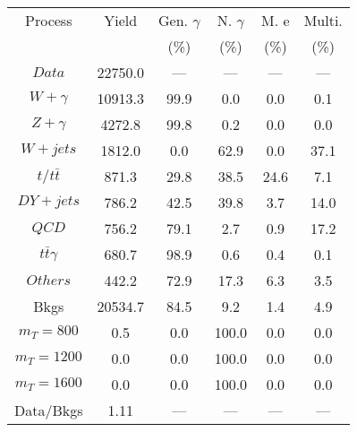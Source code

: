 \begin{figure}
\begin{minipage}[c]{0.32\textwidth}
{\begin{tabular}{cccccc}
\hline
Process & Yield & Gen. $\gamma$ & N. $\gamma$ & M. e & Multi. \\
 &  & (\%) & (\%) & (\%) & (\%)  \\
\hline
                                                                      $ Data $ &  22750.0 &  --- &  --- &  --- &  ---\\
$ W+\gamma $ &  10913.3 &  99.9 &  0.0 &  0.0 &  0.1\\
$ Z+\gamma $ &  4272.8 &  99.8 &  0.2 &  0.0 &  0.0\\
$ W+jets $ &  1812.0 &  0.0 &  62.9 &  0.0 &  37.1\\
$ t/t\bar{t} $ &  871.3 &  29.8 &  38.5 &  24.6 &  7.1\\
$ DY+jets $ &  786.2 &  42.5 &  39.8 &  3.7 &  14.0\\
$ QCD $ &  756.2 &  79.1 &  2.7 &  0.9 &  17.2\\
$ t\bar{t}\gamma $ &  680.7 &  98.9 &  0.6 &  0.4 &  0.1\\
$ Others $ &  442.2 &  72.9 &  17.3 &  6.3 &  3.5\\
Bkgs &  20534.7 &  84.5 &  9.2 &  1.4 &  4.9\\
$ m_{T} = 800 $ &  0.5 &  0.0 &  100.0 &  0.0 &  0.0\\
$ m_{T} = 1200 $ &  0.0 &  0.0 &  100.0 &  0.0 &  0.0\\
$ m_{T} = 1600 $ &  0.0 &  0.0 &  100.0 &  0.0 &  0.0\\
Data/Bkgs &  1.11 &  --- &  --- &  --- &  ---\\
\hline
\end{tabular}
}
\end{minipage}
\end{figure}

